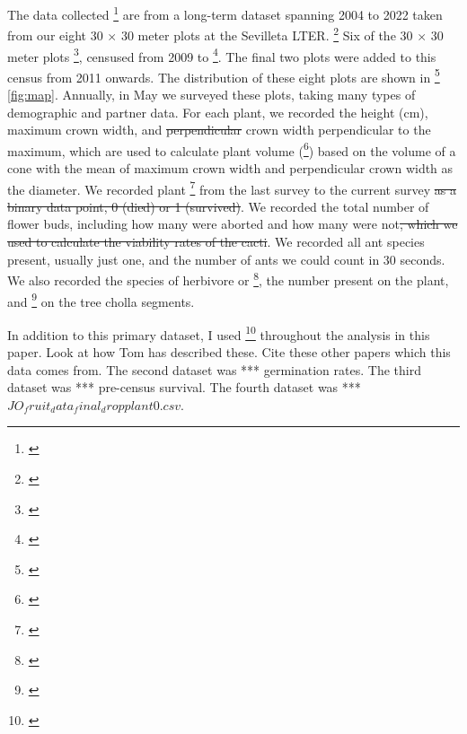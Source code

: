 \documentclass[12pt,a4paper]{article}
\newcommand{\tom}[2]{{\color{red}{#1}}\footnote{\textit{\color{red}{#2}}}}
\begin{document}
	The data collected \tom{on these cacti}{notice how these words add nothing} are from a long-term dataset spanning 2004 to 2022 taken from our eight 30 $\times$ 30 meter plots at the Sevilleta LTER. 
	\tom{The data initially included 134 naturally occurring plants across 4 spatial blocks censused annually from 2004 to 2008.}{this seems to contradict what you just said about eight plots.}
	Six of the 30 $\times$ 30 meter plots \tom{were created with naturally occurring plants}{this sounds funny, meaning unclear}, censused from 2009 to \tom{2014}{Not sure why you have these ending in 2014. These are plots 1-6, which we continue to collect data from}. 
	The final two plots were added to this census from 2011 onwards. 
	The distribution of these eight plots are shown in \tom{figure}{you probably don't need a plot map - maybe in the supplement} \ref{fig:map}.
		Annually, in May we surveyed these plots, taking many types of demographic and partner data. 
		For each plant, we recorded the height (cm), maximum crown width, and \st{perpendicular }crown width perpendicular to the maximum, which are used to calculate plant volume (\tom{cm3}{make this a superscript}) based on the volume of a cone with the mean of maximum crown width and perpendicular crown width as the diameter. 
		We recorded plant \tom{survival}{I would start with survival because if it's dead nothing else is recorded} from the last survey to the current survey\st{ as a binary data point, 0 (died) or 1 (survived)}. 
		We recorded the total number of flower buds, including how many were aborted and how many were not\st{, which we used to calculate the viability rates of the cacti}. 
		We recorded all ant species present, usually just one, and the number of ants we could count in 30 seconds. 
		We also recorded the species of herbivore or \tom{seed predator}{we do not record seed predator data}, the number present on the plant, and \tom{if there is any clear, new evidence of herbivory}{beware that this has not been very consistent} on the tree cholla segments. 
		
		In addition to this primary dataset, I used \tom{several other datasets}{I don't think you need to say much here, you can cite prevous papers when you describe these parts of the IPM} throughout the analysis in this paper.  Look at how Tom has described these. Cite these other papers which this data comes from. 
		The second dataset was *** germination rates.
		The third dataset was *** pre-census survival.
		The fourth dataset was *** $JO_fruit_data_final_dropplant0.csv$.
		
\end{document}
